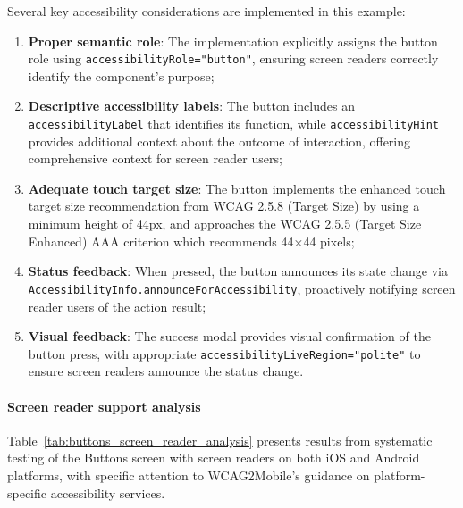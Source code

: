 Several key accessibility considerations are implemented in this example:

\begin{enumerate}
    \item \textbf{Proper semantic role}: The implementation explicitly assigns the button role using \texttt{accessibilityRole="button"}, ensuring screen readers correctly identify the component's purpose;
    
    \item \textbf{Descriptive accessibility labels}: The button includes an \texttt{accessibilityLabel} that identifies its function, while \texttt{accessibilityHint} provides additional context about the outcome of interaction, offering comprehensive context for screen reader users;
    
    \item \textbf{Adequate touch target size}: The button implements the enhanced touch target size recommendation from WCAG 2.5.8 (Target Size) by using a minimum height of 44px, and approaches the WCAG 2.5.5 (Target Size Enhanced) AAA criterion which recommends 44×44 pixels;
    
    \item \textbf{Status feedback}: When pressed, the button announces its state change via \\\texttt{AccessibilityInfo.announceForAccessibility}, proactively notifying screen reader users of the action result;
    
    \item \textbf{Visual feedback}: The success modal provides visual confirmation of the button press, with appropriate \texttt{accessibilityLiveRegion="polite"} to ensure screen readers announce the status change.
\end{enumerate}

\paragraph{Screen reader support analysis}

Table~\ref{tab:buttons_screen_reader_analysis} presents results from systematic testing of the Buttons screen with screen readers on both iOS and Android platforms, with specific attention to WCAG2Mobile's guidance on platform-specific accessibility services.

